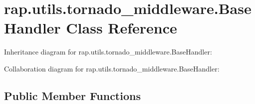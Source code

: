 \hypertarget{classrap_1_1utils_1_1tornado__middleware_1_1BaseHandler}{}\section{rap.\+utils.\+tornado\+\_\+middleware.\+Base\+Handler Class Reference}
\label{classrap_1_1utils_1_1tornado__middleware_1_1BaseHandler}


Inheritance diagram for rap.\+utils.\+tornado\+\_\+middleware.\+Base\+Handler\+:


Collaboration diagram for rap.\+utils.\+tornado\+\_\+middleware.\+Base\+Handler\+:
\subsection*{Public Member Functions}
